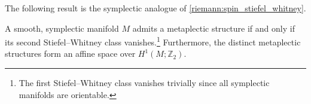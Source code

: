     The following result is the symplectic analogue of \cref{riemann:spin_stiefel_whitney}.
    \begin{property}[Obstruction]
        A smooth, symplectic manifold $M$ admits a metaplectic structure if and only if its second Stiefel--Whitney class vanishes.\footnote{The first Stiefel--Whitney class vanishes trivially since all symplectic manifolds are orientable.} Furthermore, the distinct metaplectic structures form an affine space over $H^1(M;\mathbb{Z}_2)$.
    \end{property}